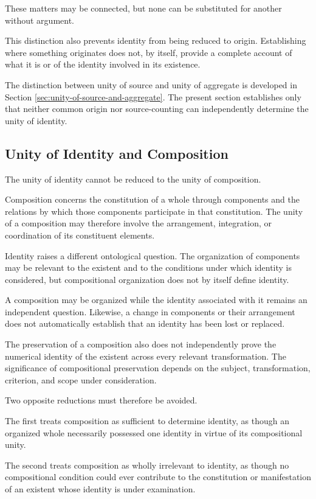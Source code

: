 These matters may be connected, but none can be
substituted for another without argument.

This distinction also prevents identity from being
reduced to origin. Establishing where something
originates does not, by itself, provide a complete
account of what it is or of the identity involved
in its existence.

The distinction between unity of source and unity
of aggregate is developed in Section
\ref{sec:unity-of-source-and-aggregate}. The present
section establishes only that neither common origin
nor source-counting can independently determine
the unity of identity.

\subsection{Unity of Identity and Composition}

The unity of identity cannot be reduced to the
unity of composition.

Composition concerns the constitution of a whole
through components and the relations by which
those components participate in that constitution.
The unity of a composition may therefore involve
the arrangement, integration, or coordination
of its constituent elements.

Identity raises a different ontological question.
The organization of components may be relevant
to the existent and to the conditions under which
identity is considered, but compositional organization
does not by itself define identity.

A composition may be organized while the identity
associated with it remains an independent question.
Likewise, a change in components or their arrangement
does not automatically establish that an identity
has been lost or replaced.

The preservation of a composition also does not
independently prove the numerical identity of
the existent across every relevant transformation.
The significance of compositional preservation
depends on the subject, transformation, criterion,
and scope under consideration.

Two opposite reductions must therefore be avoided.

The first treats composition as sufficient to
determine identity, as though an organized whole
necessarily possessed one identity in virtue
of its compositional unity.

The second treats composition as wholly irrelevant
to identity, as though no compositional condition
could ever contribute to the constitution or
manifestation of an existent whose identity is
under examination.

